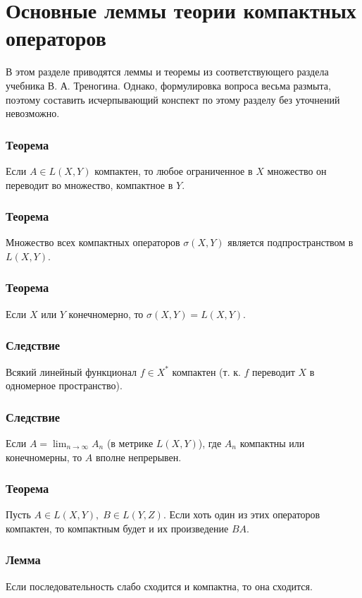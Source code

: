 \section{Основные леммы теории компактных операторов}
\label{sec:q-42}
В этом разделе приводятся леммы и теоремы из соответствующего раздела учебника В. А. Треногина\cite[с.~203]{trenogin}. Однако, формулировка вопроса весьма размыта, поэтому составить исчерпывающий конспект по этому разделу без уточнений невозможно.

\subsubsection*{Теорема}
Если $A \in L(X, Y)$ компактен, то любое ограниченное в $X$ множество он переводит во множество, компактное в $Y$.

\subsubsection*{Теорема}
Множество всех компактных операторов $\sigma(X, Y)$ является подпространством в $L(X, Y)$.

\subsubsection*{Теорема}
Если $X$ или $Y$ конечномерно, то $\sigma(X, Y) = L(X, Y)$.

\subsubsection*{Следствие}
Всякий линейный функционал $f \in X^*$ компактен (т. к. $f$ переводит $X$ в одномерное пространство).

\subsubsection*{Следствие}
Если $\displaystyle A = \lim_{n \to \infty} A_n$ (в метрике $L(X, Y)$), где $A_n$ компактны или конечномерны, то $A$ вполне непрерывен.

\subsubsection*{Теорема}
Пусть $A \in L(X, Y),\; B \in L(Y, Z)$. Если хоть один из этих операторов компактен, то компактным будет и их произведение $BA$.

\subsubsection*{Лемма}
Если последовательность слабо сходится и компактна, то она сходится.

